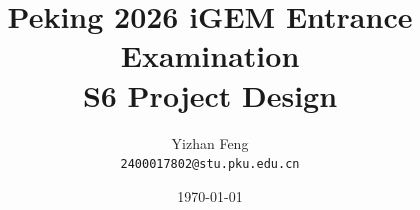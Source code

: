 \title{\textbf{Peking 2026 iGEM Entrance Examination} \\[0.5em]
    \Large S6 Project Design}
\author{Yizhan Feng \\ 
    \normalsize{\texttt{2400017802@stu.pku.edu.cn}}}
\date{\today}